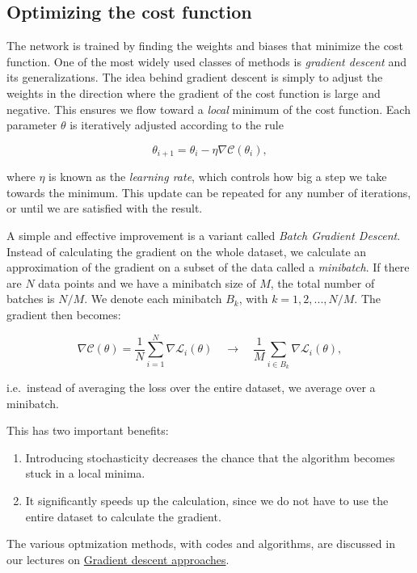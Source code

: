 \documentclass[%
oneside,                 %
final,                   %
10pt]{article}
\begin{document}
\subsection{Optimizing the cost function}

The network is trained by finding the weights and biases that minimize the cost function. One of the most widely used classes of methods is \emph{gradient descent} and its generalizations. The idea behind gradient descent
is simply to adjust the weights in the direction where the gradient of the cost function is large and negative. This ensures we flow toward a \emph{local} minimum of the cost function.  
Each parameter $\theta$ is iteratively adjusted according to the rule  

$$ \theta_{i+1} = \theta_i - \eta \nabla \mathcal{C}(\theta_i) ,$$

where $\eta$ is known as the \emph{learning rate}, which controls how big a step we take towards the minimum.  
This update can be repeated for any number of iterations, or until we are satisfied with the result.  

A simple and effective improvement is a variant called \emph{Batch Gradient Descent}.  
Instead of calculating the gradient on the whole dataset, we calculate an approximation of the gradient
on a subset of the data called a \emph{minibatch}.  
If there are $N$ data points and we have a minibatch size of $M$, the total number of batches
is $N/M$.  
We denote each minibatch $B_k$, with $k = 1, 2,...,N/M$. The gradient then becomes:  

$$ \nabla \mathcal{C}(\theta) = \frac{1}{N} \sum_{i=1}^N \nabla \mathcal{L}_i(\theta) \quad \rightarrow \quad
\frac{1}{M} \sum_{i \in B_k} \nabla \mathcal{L}_i(\theta) ,$$

i.e.~instead of averaging the loss over the entire dataset, we average over a minibatch.  

This has two important benefits:  
\begin{enumerate}
\item Introducing stochasticity decreases the chance that the algorithm becomes stuck in a local minima.  

\item It significantly speeds up the calculation, since we do not have to use the entire dataset to calculate the gradient.  
\end{enumerate}

\noindent
The various optmization  methods, with codes and algorithms,  are discussed in our lectures on \href{{https://compphysics.github.io/MachineLearning/doc/pub/Splines/html/Splines-bs.html}}{Gradient descent approaches}.
\end{document}
